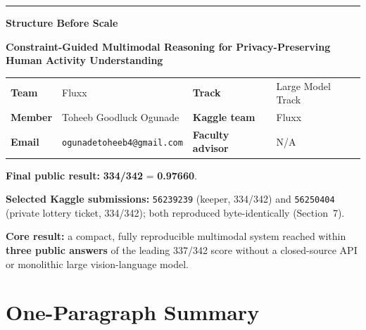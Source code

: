 \documentclass[12pt,a4paper]{article}
\newcommand{\score}{\textbf{334/342}}
\newcommand{\pubscore}{\textbf{0.97660}}
\begin{document}


{\color{FluxxNavy}\rule{\textwidth}{2.1pt}}

\vspace{0.45em}

{\LARGE\bfseries
Structure Before Scale
}

\vspace{0.15em}

{\large\bfseries\color{FluxxBlue}
Constraint-Guided Multimodal Reasoning for Privacy-Preserving Human Activity Understanding
}

\vspace{0.6em}

\begin{tabularx}{\textwidth}{@{}>{\bfseries}l X >{\bfseries}l X@{}}
Team & Fluxx &
Track & Large Model Track \\

Member & Toheeb Goodluck Ogunade &
Kaggle team & Fluxx \\

Email & \texttt{ogunadetoheeb4@gmail.com} &
Faculty advisor & N/A
\end{tabularx}

\vspace{0.45em}

\begin{resultbox}
\textbf{Final public result:}
\score{} = \pubscore.

\textbf{Selected Kaggle submissions:}
\texttt{56239239} (keeper, 334/342) and
\texttt{56250404} (private lottery ticket, 334/342);
both reproduced byte-identically (Section~7).

\textbf{Core result:}
a compact, fully reproducible multimodal system reached within
\textbf{three public answers} of the leading 337/342 score without a
closed-source API or monolithic large vision-language model.
\end{resultbox}

\section{One-Paragraph Summary}
\end{document}
